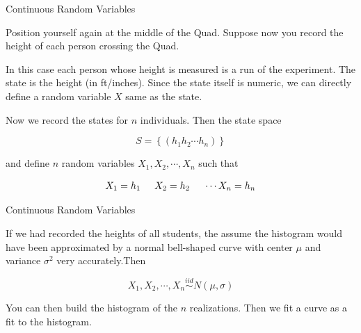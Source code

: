 \documentclass{beamer}\usepackage[]{graphicx}\usepackage[]{color}
\begin{document}
\begin{frame}{Continuous Random Variables}

Position yourself again at the middle of the Quad. Suppose now you record the height of each person crossing the Quad. \pause \newline

In this case each person whose height is measured is a run of the experiment. The state is the height (in ft/inches). Since the state itself is numeric, we can directly define a random variable $X$ same as the state. \pause \newline

Now we record the states for $n$ individuals. Then the state space

$$ S = \left \{ (h_1 h_2 \cdots h_n) \right \} $$

and define $n$ random variables $X_1, X_2, \cdots, X_n$ such that

$$ X_1 = h_1 \hspace{0.5 cm} X_2=h_2 \hspace{0.5 cm}\cdots X_{n}=h_{n} $$

\end{frame}

\begin{frame}{Continuous Random Variables}

If we had recorded the heights of all students, the assume the histogram would have been approximated by a normal bell-shaped curve with center $\mu$ and variance $\sigma^2$ very accurately.Then

$$ X_1, X_2, \cdots, X_{n} \stackrel{iid}{\sim} N(\mu, \sigma)  $$ \pause \newline

You can then build the histogram of the $n$ realizations. Then we fit a curve as a fit to the histogram. \pause \newline

\end{frame}
\end{document}
